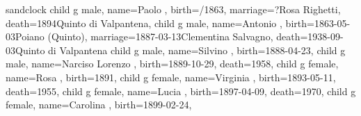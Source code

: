 \documentclass{article}
\begin{document}
\begin{midpage}
\begin{center}

\begin{genealogypicture}[
    processing=database,
    database format=full,
    node size=3.8cm,
    level size=2.8cm,
    level distance=6mm,
    list separators hang=3mm,
    name font=\bfseries,
    surn code={\textcolor{black!50!black}{#1}},
    place text={\newline}{},
    date format=d month yyyy,
    tcbset={male/.style={colframe=blue,colback=blue!5},
    female/.style={colframe=red,colback=red!5}},
    box={fit basedim=7pt,boxsep=2pt,segmentation style=solid,
        halign=left,before upper=\parskip1pt,
        \gtrDBsex,
    },
]
sandclock
{
    child{
        g{
            male,
            name={Paolo },
            birth={/1863}{},
            marriage={?}{Rosa Righetti},
            death={1894}{Quinto di Valpantena},
        }
        child{
            g{
                male,
                name={Antonio },
                birth={1863-05-03}{Poiano (Quinto)},
                marriage={1887-03-13}{Clementina Salvagno},
                death={1938-09-03}{Quinto di Valpantena}
            }
            child{
                g{
                    male,
                    name={Silvino },
                    birth={1888-04-23}{},
                }
            }
            child{
                g{
                    male,
                    name={Narciso Lorenzo },
                    birth={1889-10-29}{},
                    death={1958}{},
                }
            }
            child{
                g{
                    female,
                    name={Rosa },
                    birth={1891}{},
                }
            }
            child{
                g{
                    female,
                    name={Virginia },
                    birth={1893-05-11}{},
                    death={1955}{},
                }
            }
            child{
                g{
                    female,
                    name={Lucia },
                    birth={1897-04-09}{},
                    death={1970}{},
                }
            }
            child{
                g{
                    female,
                    name={Carolina },
                    birth={1899-02-24}{},
                }
            }
}}}
\end{genealogypicture}
\end{center}
\end{midpage}
\end{document}
